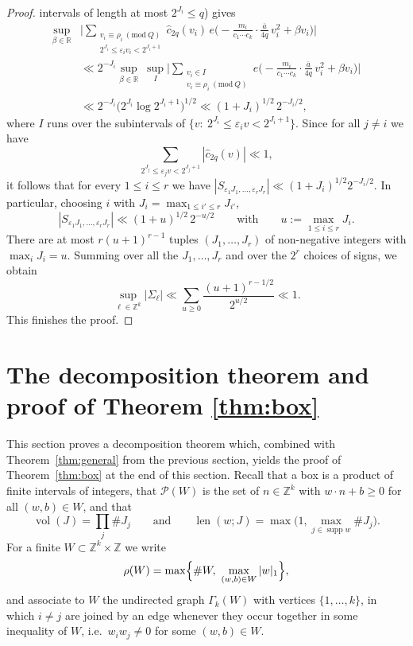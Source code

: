 \documentclass[a4paper,reqno,12pt]{amsart}
\theoremstyle{plain}
\theoremstyle{plain}
\theoremstyle{remark}
\theoremstyle{plain}
\newcommand{\cP}{\mathscr{P}}
\newcommand{\z}{\mathbb{Z}}
\newcommand{\RR}{\mathbb{R}}
\newcommand{\supp}{\operatorname{supp}}
\newcommand{\vol}{\operatorname{vol}}
\newcommand{\len}{\operatorname{len}}
\theoremstyle{plain}
\theoremstyle{plain}
\begin{document}
{\begin{proof}
intervals of length at most $2^{J_i}\leq q$) gives
\begin{align*}
\sup_{\beta\in\RR} & \Big|\sum_{\substack{v_i\equiv\rho_i\ (\mathrm{mod}\ Q)\\ 2^{J_i}\le\varepsilon_iv_i<2^{J_i+1}}}
\widehat c_{2q}(v_i)\,e\Big(-\frac{m_i}{c_1\cdots c_k}\cdot\frac{\overline a}{4q}\,v_i^2+\beta v_i\Big)\Big|
\\ & \ll 2^{-J_i}\sup_{\beta\in\RR}\ \sup_{I}\Big|\sum_{\substack{v_i\in I\\ v_i\equiv\rho_i\ (\mathrm{mod}\ Q)}}
e\Big(-\frac{m_i}{c_1\cdots c_k}\cdot\frac{\overline a}{4q}\,v_i^2+\beta v_i\Big)\Big|
\\ & \ll 2^{-J_i}\bigl(2^{J_i}\log 2^{J_i+1}\bigr)^{1/2}
\ll (1+J_i)^{1/2}\,2^{- J_i / 2}{,}
\end{align*}
where $I$ runs over the subintervals of
$\{v:\ 2^{J_i}\le\varepsilon_iv<2^{J_i+1}\}$.
Since for all $j \neq i$ {we have}
 $$\sum_{2^{J_j}\le\varepsilon_jv<2^{J_j+1}}|\widehat c_{2q}(v)|\ll1{,}$$
it follows that for every $1 \leq i \leq r$ we have $|S_{\varepsilon_1J_1,\ldots,\varepsilon_rJ_r}|\ll(1+J_i)^{1/2}2^{-J_i/2}$.
In particular, choosing $i$ with $J_i=\max_{1\leq i'\leq r}J_{i'}$,
$$
|S_{\varepsilon_1 J_1, \ldots, \varepsilon_r J_r}| \ll (1+u)^{1/2}\,2^{-u/2}
\qquad\text{with}\qquad u:=\max_{1 \leq i \leq r} J_i.
$$
There are at most $r(u+1)^{r-1}$ tuples $(J_1,\ldots,J_r)$ of non-negative
integers with $\max_iJ_i=u$. Summing over all the $J_1, \ldots, J_r$ and
over the $2^r$ choices of signs, we obtain
$$
\sup_{\ell \in \mathbb{Z}^k} |\Sigma_{\ell}| \ll \sum_{u \geq 0} \frac{(u+1)^{r - 1/2}}{2^{u/2}} \ll 1.
$$
This finishes the proof.
\end{proof}



\section{The decomposition theorem and proof of Theorem \ref{thm:box}}\label{sec:decomp}

This section proves a decomposition theorem which, combined with Theorem~\ref{thm:general}
from the previous section, yields the proof of Theorem~\ref{thm:box} at the end of this section.
Recall that a box is a product of finite intervals of integers, that $\cP(W)$ is the set of
$n\in\z^k$ with $w\cdot n+b\ge0$ for all $(w,b)\in W$, and that
\[
  \vol(J)=\prod_j\#J_j\qquad\text{and}\qquad
  \len(w;J)=\max\bigl(1,\max_{j\in\supp w}\#J_j\bigr).
\]
For a finite $W\subset\z^k\times\z$ we write
\[
 \rho(W)=\max\Bigl\{\#W,\ \max_{(w,b)\in W}|w|_1\Bigr\},
\]
and associate to $W$ the undirected graph $\Gamma_k(W)$ with vertices $\{1, \ldots, k\}$, in which $i\neq j$ are joined
by an edge whenever they occur together in some inequality of $W$, i.e.\ $w_iw_j\neq0$ for some $(w,b)\in W$.

}
\end{document}
